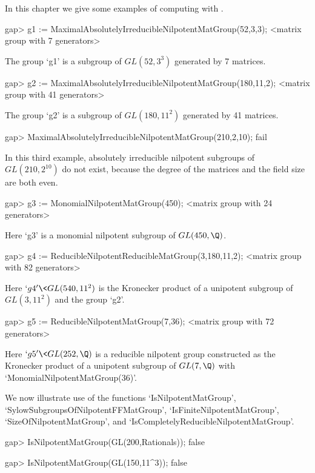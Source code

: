 
In this chapter we give some examples of computing with .


\beginexample
gap> g1 := MaximalAbsolutelyIrreducibleNilpotentMatGroup(52,3,3);
<matrix group with 7 generators>
\endexample

The group `g1' is a subgroup of $GL(52,3^3)$ generated by 7 matrices.

\beginexample
gap> g2 := MaximalAbsolutelyIrreducibleNilpotentMatGroup(180,11,2);
<matrix group with 41 generators>
\endexample

The group `g2' is a subgroup of $GL(180,11^2)$ generated by 41 matrices.

\beginexample
gap> MaximalAbsolutelyIrreducibleNilpotentMatGroup(210,2,10);
fail
\endexample

In this third example, absolutely irreducible nilpotent subgroups of
$GL(210,2^{10})$ do not exist, because the degree of the matrices
and the field size are both even.

\beginexample
gap> g3 := MonomialNilpotentMatGroup(450);
<matrix group with 24 generators>
\endexample

Here `g3' is a monomial nilpotent subgroup of $GL(450,\Q)$.

\beginexample
gap> g4 := ReducibleNilpotentReducibleMatGroup(3,180,11,2);
<matrix group with 82 generators>
\endexample

Here $`g4' \< GL(540,11^2)$ is the Kronecker product of a
unipotent subgroup of $GL(3,11^2)$ and the group `g2'.

\beginexample
gap> g5 := ReducibleNilpotentMatGroup(7,36);
<matrix group with 72 generators>
\endexample

Here $`g5' \< GL(252, \Q)$ is a reducible nilpotent group constructed
as the Kronecker product of a unipotent subgroup of $GL(7,\Q)$ with
`MonomialNilpotentMatGroup(36)'.


We now illustrate use of the functions
`IsNilpotentMatGroup',
`SylowSubgroupsOfNilpotentFFMatGroup',
`IsFiniteNilpotentMatGroup',
`SizeOfNilpotentMatGroup', and
`IsCompletelyReducibleNilpotentMatGroup'.

\beginexample
gap> IsNilpotentMatGroup(GL(200,Rationals));
false

gap> IsNilpotentMatGroup(GL(150,11^3));
false


